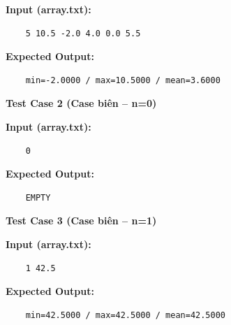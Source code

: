     \textbf{Input (array.txt):}
    \begin{lstlisting}
    5 10.5 -2.0 4.0 0.0 5.5\end{lstlisting}

    \textbf{Expected Output:}
    \begin{lstlisting}
    min=-2.0000 / max=10.5000 / mean=3.6000\end{lstlisting}

    \vspace{0.5cm}

    \textbf{Test Case 2 (Case biên -- n=0)}

    \textbf{Input (array.txt):}
    \begin{lstlisting}
    0\end{lstlisting}

    \textbf{Expected Output:}
    \begin{lstlisting}
    EMPTY\end{lstlisting}
    \textbf{Test Case 3 (Case biên -- n=1)}

    \textbf{Input (array.txt):}
    \begin{lstlisting}
    1 42.5\end{lstlisting}

    \textbf{Expected Output:}
    \begin{lstlisting}
    min=42.5000 / max=42.5000 / mean=42.5000\end{lstlisting}